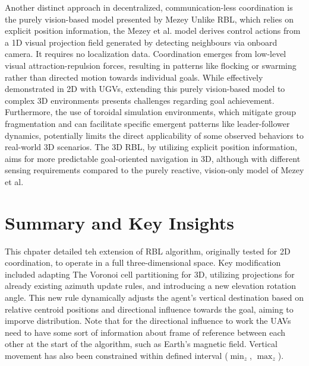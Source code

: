         Another distinct approach in decentralized, communication-less coordination is the purely vision-based model presented by Mezey \cite{mezey_pure_vision}
        Unlike RBL, which relies on explicit position information, the Mezey et al. model derives control actions from a 1D visual projection field generated by detecting neighbours via onboard camera. 
        It requires no localization data. Coordination emerges from low-level visual attraction-repulsion forces, resulting in patterns like flocking or swarming rather than directed motion towards individual goals. 
        While effectively demonstrated in \ac{2D} with \ac{UGV}s, extending this purely vision-based model to complex \ac{3D} environments presents challenges regarding goal achievement. 
        Furthermore, the use of toroidal simulation environments, which mitigate group fragmentation and can facilitate specific emergent patterns like leader-follower dynamics, potentially limits the direct applicability of some observed behaviors to real-world \ac{3D} scenarios.
        The \ac{3D} RBL, by utilizing explicit position information, aims for more predictable goal-oriented navigation in \ac{3D}, although with different sensing requirements compared to the purely reactive, vision-only model of Mezey et al. 
                
    \section{Summary and Key Insights}
        This chpater detailed teh extension of \ac{RBL} algorithm, originally tested for \ac{2D} coordination, to operate in a full three-dimensional space.
        Key modification included adapting The Voronoi cell partitioning for \ac{3D}, utilizing projections for already existing azimuth update rules, and introducing a new elevation rotation angle.
        This new rule dynamically adjusts the agent's vertical destination based on relative centroid positions and directional influence towards the goal, aiming to imporve distribution.
        Note that for the directional influence to work the \ac{UAV}s need to have some sort of information about frame of reference between each other at the start of the algorithm, such as Earth's magnetic field.
        Vertical movement has also been constrained within defined interval ($\min_z$, $\max_z$).

